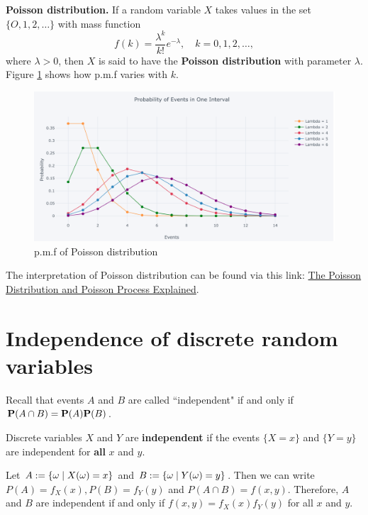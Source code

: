 \begin{example}
\textbf{Poisson distribution.} If a random variable $X$ takes values in the set $\{O, 1, 2, \dots \}$ with mass function
\begin{equation*}
    f(k) = \frac{\lambda^k}{k!} e^{-\lambda}, \quad k = 0, 1, 2, \dots, 
\end{equation*}
where $\lambda > 0$, then $X$ is said to have the \textbf{Poisson distribution} with parameter $\lambda$. Figure \ref{fig:poisson} shows how p.m.f varies with $k$.
\begin{figure}[!htb]
    \centering
    \includegraphics[scale=0.18]{plots/poisson.png}
    \caption{p.m.f of Poisson distribution}
    \label{fig:poisson}
\end{figure}

\begin{remark}
The interpretation of Poisson distribution can be found via this link: \href{https://towardsdatascience.com/the-poisson-distribution-and-poisson-process-explained-4e2cb17d459}{The Poisson Distribution and Poisson Process Explained}.
\end{remark}
\end{example}


\section{Independence of discrete random variables}
Recall that events $A$ and $B$ are called ``independent" if and only if $\mathbf{P}(A \cap B) = \mathbf{P}(A)\mathbf{P}(B)$. 

\begin{definition}
Discrete variables $X$ and $Y$ are \textbf{independent} if the events $\{X = x\}$ and $\{Y = y\}$ are independent for \textbf{all} $x$ and $y$. 
\end{definition}

Let $A: = \{ \omega \;\vert\; X(\omega) = x \}$ and $B:= \{ \omega \;\vert\; Y(\omega) = y \}$. Then we can write $P(A) = f_X(x), P(B) = f_Y(y)$ and $P(A \cap B) = f(x, y)$. Therefore, $A$ and $B$ are independent if and only if $f(x,y) = f_X(x) f_Y(y)$ for all $x$ and $y$.

